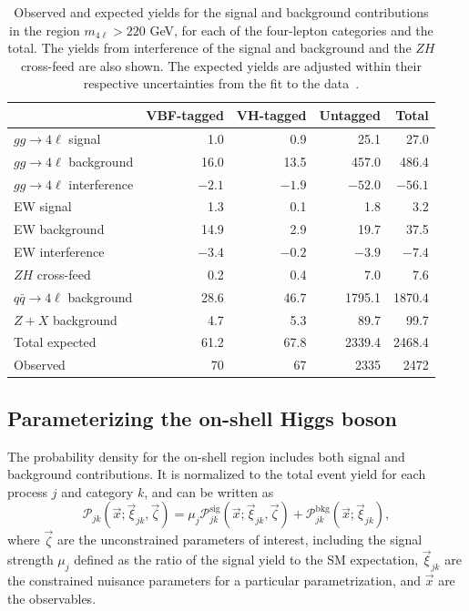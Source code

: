 \begin{table}[!hbt] 
\centering
\begin{tabular}{lrrrr}
& VBF-tagged & VH-tagged & Untagged & Total \\
\hline
$gg\to4\ell$ signal &1.0 & 0.9 & 25.1 & 27.0 \\
$gg\to4\ell$ background & 16.0 & 13.5 & 457.0& 486.4 \\
$gg\to4\ell$ interference & $-2.1$ & $-1.9$  &  $-52.0$ & $-56.1$ \\
EW signal         & 1.3 & 0.1 & 1.8& 3.2\\
EW background     & 14.9 & 2.9 & 19.7& 37.5\\
EW interference     & $-3.4$ & $-0.2$ & $-3.9$ & $-7.4$ \\
$ZH$ cross-feed & 0.2 & 0.4 & 7.0& 7.6 \\
$q\bar{q}\to4\ell$ background & 28.6 & 46.7 & 1795.1 & 1870.4  \\
$Z+X$ background & 4.7 & 5.3 & 89.7& 99.7  \\
Total expected & 61.2 & 67.8 & 2339.4 & 2468.4\\
Observed & 70 & 67 & 2335 & 2472 \\
\end{tabular}
\caption{Observed and expected yields for the \Hboson signal and background contributions 
in the \offshell region $m_{4\ell}> 220$ GeV, for each of the four-lepton categories and the total. 
The yields from interference of the signal and background and the $ZH$ cross-feed are also shown. 
The expected yields are adjusted within their respective uncertainties from the fit to the data~\cite{PhysRevD.111.092014}.}
\label{tab:templateyields_offshell}
\end{table}

\subsection{Parameterizing the on-shell Higgs boson} \label{sec:onshell}

The probability density for the on-shell region includes both signal and background contributions.  It is normalized to the total event yield for each process $j$ and category $k$, and can be written as
\begin{equation}
  \mathcal{P}_{jk}(\vec{x};\vec{\xi}_{jk},\vec\zeta) = 
  \mu_j\mathcal{P}_{jk}^\text{sig} (\vec{x};\vec{\xi}_{jk},\vec\zeta) +
  \mathcal{P}_{jk}^\text{bkg}(\vec{x};\vec{\xi}_{jk}),
  \label{eq:ponshell}
\end{equation}
where $\vec\zeta$ are the unconstrained parameters of interest,
including the signal strength $\mu_j$ defined as the ratio of the signal yield to the SM expectation,
$\vec{\xi}_{jk}$ are the constrained nuisance parameters for a particular parametrization,
and $\vec{x}$ are the observables.

